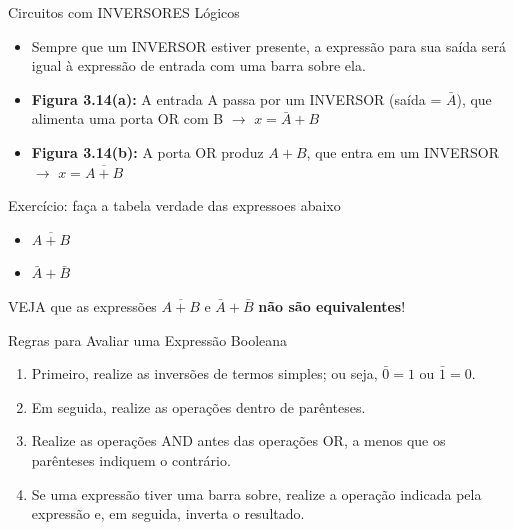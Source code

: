 \begin{frame}{Circuitos com INVERSORES Lógicos}

    \begin{itemize}
        \item Sempre que um INVERSOR estiver presente, a expressão para sua saída será igual à expressão de entrada com uma barra sobre ela.
        \item \textbf{Figura 3.14(a):} A entrada A passa por um INVERSOR (saída = $\bar{A}$), que alimenta uma porta OR com B $\rightarrow$ $x = \bar{A} + B$
        \item \textbf{Figura 3.14(b):} A porta OR produz $A + B$, que entra em um INVERSOR $\rightarrow$ $x = \overline{A + B}$
    \end{itemize}
    \begin{block}{Exercício: faça a tabela verdade das expressoes abaixo}
        \begin{itemize}
            \item $\overline{A + B}$
            \item $\bar{A} + \bar{B}$
        \end{itemize}
        VEJA que as expressões $\overline{A + B}$ e $\bar{A} + \bar{B}$ \textbf{não são equivalentes}!
    \end{block}
\end{frame}

\begin{frame}{Regras para Avaliar uma Expressão Booleana}
    \begin{enumerate}
        \item Primeiro, realize as inversões de termos simples; ou seja, $ \bar{0} = 1 $ ou $ \bar{1} = 0 $.
        \item Em seguida, realize as operações dentro de parênteses.
        \item Realize as operações AND antes das operações OR, a menos que os parênteses indiquem o contrário.
        \item Se uma expressão tiver uma barra sobre, realize a operação indicada pela expressão e, em seguida, inverta o resultado.
    \end{enumerate}


\end{frame}


